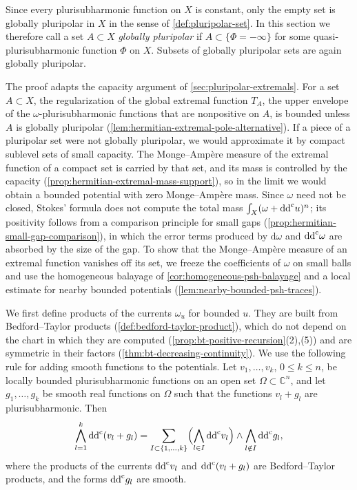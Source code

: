 Since every plurisubharmonic function on $X$ is constant, only the empty set is globally pluripolar in $X$ in the sense of \cref{def:pluripolar-set}. In this section we therefore call a set $A\subset X$ \emph{globally pluripolar} if $A\subset\{\Phi=-\infty\}$ for some quasi-plurisubharmonic function $\Phi$ on $X$. Subsets of globally pluripolar sets are again globally pluripolar.

The proof adapts the capacity argument of \cref{sec:pluripolar-extremals}. For a set $A\subset X$, the regularization of the global extremal function $T_A$, the upper envelope of the $\omega$-plurisubharmonic functions that are nonpositive on $A$, is bounded unless $A$ is globally pluripolar (\cref{lem:hermitian-extremal-pole-alternative}). If a piece of a pluripolar set were not globally pluripolar, we would approximate it by compact sublevel sets of small capacity. The Monge--Amp\`ere measure of the extremal function of a compact set is carried by that set, and its mass is controlled by the capacity (\cref{prop:hermitian-extremal-mass-support}), so in the limit we would obtain a bounded potential with zero Monge--Amp\`ere mass. Since $\omega$ need not be closed, Stokes' formula does not compute the total mass $\int_X(\omega+\mathrm{dd}^{\mathrm{c}} u)^n$; its positivity follows from a comparison principle for small gaps (\cref{prop:hermitian-small-gap-comparison}), in which the error terms produced by $\mathrm d\omega$ and $\mathrm{dd}^{\mathrm{c}}\omega$ are absorbed by the size of the gap. To show that the Monge--Amp\`ere measure of an extremal function vanishes off its set, we freeze the coefficients of $\omega$ on small balls and use the homogeneous balayage of \cref{cor:homogeneous-psh-balayage} and a local estimate for nearby bounded potentials (\cref{lem:nearby-bounded-psh-traces}).

We first define products of the currents $\omega_u$ for bounded $u$. They are built from Bedford--Taylor products (\cref{def:bedford-taylor-product}), which do not depend on the chart in which they are computed (\cref{prop:bt-positive-recursion}(2),(5)) and are symmetric in their factors (\cref{thm:bt-decreasing-continuity}). We use the following rule for adding smooth functions to the potentials. Let $v_1,\ldots,v_k$, $0\leq k\leq n$, be locally bounded plurisubharmonic functions on an open set $\Omega\subset\mathbb C^n$, and let $g_1,\ldots,g_k$ be smooth real functions on $\Omega$ such that the functions $v_l+g_l$ are plurisubharmonic. Then
\begin{equation}\label{eq:hermitian-smooth-shift-expansion}
 \bigwedge_{l=1}^k\mathrm{dd}^{\mathrm{c}}(v_l+g_l)=\sum_{I\subset\{1,\ldots,k\}}\Bigl(\bigwedge_{l\in I}\mathrm{dd}^{\mathrm{c}} v_l\Bigr)\wedge\bigwedge_{l\notin I}\mathrm{dd}^{\mathrm{c}} g_l,
\end{equation}
where the products of the currents $\mathrm{dd}^{\mathrm{c}} v_l$ and $\mathrm{dd}^{\mathrm{c}}(v_l+g_l)$ are Bedford--Taylor products, and the forms $\mathrm{dd}^{\mathrm{c}} g_l$ are smooth.

